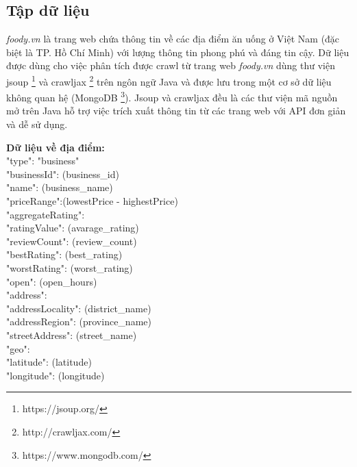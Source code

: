 \documentclass[12pt]{extarticle}
\begin{document}
		\subsection{Tập dữ liệu}
			\par \textit{foody.vn} là trang web chứa thông tin về các địa điểm ăn uống ở Việt Nam (đặc biệt là TP. Hồ Chí Minh) với lượng thông tin phong phú và đáng tin cậy. Dữ liệu được dùng cho việc phân tích được crawl từ trang web \textit{foody.vn} dùng thư viện jsoup \footnote[2]{https://jsoup.org/} và crawljax \footnote[3]{http://crawljax.com/} trên ngôn ngữ Java và được lưu trong một cơ sở dữ liệu không quan hệ (MongoDB \footnote[4]{https://www.mongodb.com/}). Jsoup và crawljax đều là các thư viện mã nguồn mở trên Java hỗ trợ việc trích xuất thông tin từ các trang web với API đơn giản và dễ sử dụng.
			\par \textbf{Dữ liệu về địa điểm:}\\
				{\selectfont
				"type": "business"\\
				"businessId": (business\_id)\\
				"name": (business\_name)\\
				"priceRange":(lowestPrice - highestPrice)\\
				"aggregateRating":\\
				\hspace*{1.5cm}"ratingValue": (avarage\_rating)\\
				\hspace*{1.5cm}"reviewCount": (review\_count)\\
				\hspace*{1.5cm}"bestRating": (best\_rating)\\
				\hspace*{1.5cm}"worstRating": (worst\_rating)\\
				"open": (open\_hours)\\
				"address": \\
				\hspace*{1.5cm}"addressLocality": (district\_name)\\
				\hspace*{1.5cm}"addressRegion": (province\_name)\\
				\hspace*{1.5cm}"streetAddress": (street\_name)\\
				"geo":\\
				\hspace*{1.5cm}"latitude": (latitude)\\
				\hspace*{1.5cm}"longitude": (longitude)
				}
\end{document}
